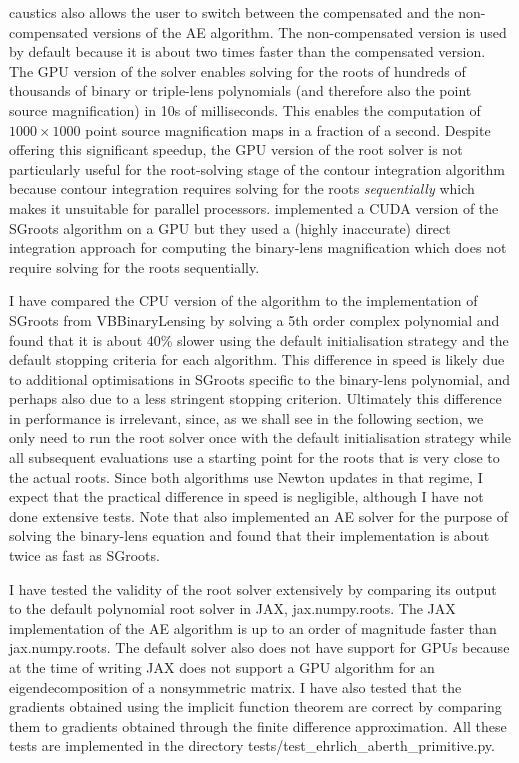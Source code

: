 \documentclass[12pt,dvipsnames]{report}
\newcommand{\ssf}[1]{\textsf{#1}}
\begin{document}
\ssf{caustics} also allows the user to switch between the compensated  and the non-compensated 
versions of the AE algorithm. The non-compensated version is used by default because 
it is about two times faster than the compensated version. The GPU version of the 
solver enables solving for the roots of hundreds of thousands of binary or triple-lens 
polynomials (and therefore also the point source magnification) in 10s of milliseconds.  
This enables the computation of $1000 \times 1000$ point source magnification maps 
in a fraction of a second. Despite offering this significant speedup, the GPU version of the 
root solver is not particularly useful for the root-solving stage of the contour integration 
algorithm because  contour integration requires solving for the roots \emph{sequentially}
which makes it unsuitable for parallel processors.
\citet{mcdougall2014} implemented a \ssf{CUDA} version of the \ssf{SGroots} algorithm 
on a GPU but they used  a (highly inaccurate) direct integration approach for 
computing the binary-lens magnification which does not require solving for the roots 
sequentially. 

I have compared the CPU version of the algorithm to the implementation of \ssf{SGroots} 
from \ssf{VBBinaryLensing} by solving a 5th order complex polynomial and found that 
it is about 40\% slower using the default initialisation strategy and the default 
stopping criteria for each algorithm. This difference in speed is likely due to additional 
optimisations in \ssf{SGroots} specific to the binary-lens polynomial, and perhaps also due 
to  a less stringent stopping criterion. Ultimately this difference in performance is 
irrelevant, since, as we shall see in the following section, we only need to run the 
root solver once  with the default initialisation strategy while all subsequent evaluations 
use a starting  point for the roots that is very close to the actual roots. 
Since both algorithms use Newton updates in that regime, I expect that the practical 
difference in speed is negligible, although I have not done extensive tests.  
Note that \citet{2022MNRAS.514.4379F} also implemented an AE solver for 
the purpose of solving the binary-lens equation and found that their implementation 
is about twice as fast as \ssf{SGroots}. 

I have tested the validity of the root solver extensively by comparing its output to the 
default polynomial root solver in \ssf{JAX}, \ssf{jax.numpy.roots}. The \ssf{JAX} 
implementation of the AE algorithm is up to an order of magnitude faster than 
\ssf{jax.numpy.roots}. The default solver also does not have support for GPUs because 
at the time of writing \ssf{JAX} does not support a GPU algorithm for an eigendecomposition 
of a nonsymmetric matrix.
I have also tested that the gradients obtained using the implicit function theorem are 
correct by comparing them to gradients obtained through the finite 
difference approximation. All these tests are implemented in the directory
\ssf{tests/test\_ehrlich\_aberth\_primitive.py}.
\end{document}
